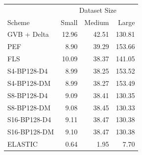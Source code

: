 \begin{tabular}{lrrr}
\toprule
 & \multicolumn{3}{c}{Dataset Size} \\
Scheme & Small & Medium & Large \\
\midrule
GVB + Delta & 12.96 & 42.51 & 130.81 \\
PEF & 8.90 & 39.29 & 153.66 \\
FLS & 10.09 & 38.37 & 141.05 \\
S4-BP128-D4 & 8.99 & 38.25 & 153.52 \\
S4-BP128-DM & 8.99 & 38.27 & 153.49 \\
S8-BP128-D4 & 9.09 & 38.41 & 130.35 \\
S8-BP128-DM & 9.08 & 38.45 & 130.33 \\
S16-BP128-D4 & 9.11 & 38.47 & 130.38 \\
S16-BP128-DM & 9.10 & 38.47 & 130.38 \\
ELASTIC & 0.64 & 1.95 & 7.70 \\
\bottomrule
\end{tabular}
